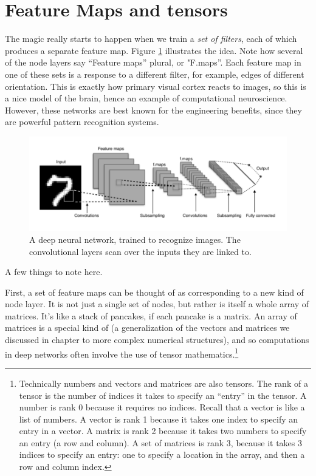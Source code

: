 \section{Feature Maps and tensors}

The magic really starts to happen when we train a \emph{set of filters}, each of which produces a separate feature map.  Figure \ref{deep_net2} illustrates the idea. Note how several of the node layers say ``Feature maps'' plural, or "F.maps''. Each feature map in one of these sets is a response to a different filter, for example, edges of different orientation. This is exactly how primary visual cortex reacts to images, so this is a nice model of the brain, hence an example of computational  neuroscience. However, these networks are best known for the engineering benefits, since they are powerful pattern recognition systems.


\begin{figure}[h]
\centering
\includegraphics[scale=.45]{./images/deepNet.png}
\caption[Adapted from a creative commons image by Aphex34 at \url{https://commons.wikimedia.org/wiki/File:Typical_cnn.png} ]{A deep neural network, trained to recognize images. The convolutional layers scan over the inputs they are linked to. }
\label{deep_net2}
\end{figure}

A few things to note here.

First, a set of feature maps can be thought of as corresponding to a new kind of node layer. It is not just a  single set of nodes, but rather is itself a whole array of matrices. It's like a stack of pancakes, if each pancake is a matrix.  An array of matrices is a special kind of  (a generalization of the vectors and matrices we discussed in chapter  to more complex numerical structures), and so computations in deep networks often involve the use of tensor mathematics.\footnote{Technically numbers and vectors and matrices are also tensors. The rank of a  tensor is the number of indices it takes to specify an ``entry'' in the tensor. A number is rank 0 because it requires no indices. Recall that a vector is like a list of numbers. A vector is rank 1 because it takes one index to specify an entry in a vector. A matrix is rank 2 because it takes two numbers to specify an entry (a row and column). A set of matrices is rank 3, because it takes 3 indices to specify an entry: one to specify a location in the array, and then a row and column index.}  

